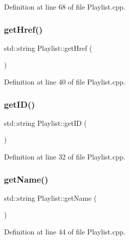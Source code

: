 Definition at line 68 of file Playlist.\+cpp.

\mbox{\label{class_playlist_a666019c1bbb7850383024bd6c0951b70}} 
\subsubsection{\texorpdfstring{get\+Href()}{getHref()}}
{\footnotesize\ttfamily std\+::string Playlist\+::get\+Href (\begin{DoxyParamCaption}{ }\end{DoxyParamCaption})}



Definition at line 40 of file Playlist.\+cpp.

\mbox{\label{class_playlist_afae241b1fda9875ae8da118ac7ef9c73}} 
\subsubsection{\texorpdfstring{get\+I\+D()}{getID()}}
{\footnotesize\ttfamily std\+::string Playlist\+::get\+ID (\begin{DoxyParamCaption}{ }\end{DoxyParamCaption})}



Definition at line 32 of file Playlist.\+cpp.

\mbox{\label{class_playlist_a569ad905cc657c46f25b210a21186b2f}} 
\subsubsection{\texorpdfstring{get\+Name()}{getName()}}
{\footnotesize\ttfamily std\+::string Playlist\+::get\+Name (\begin{DoxyParamCaption}{ }\end{DoxyParamCaption})}



Definition at line 44 of file Playlist.\+cpp.

\mbox{\label{class_playlist_aa7ddfe2017eea09bba019a3754818d7e}} 
